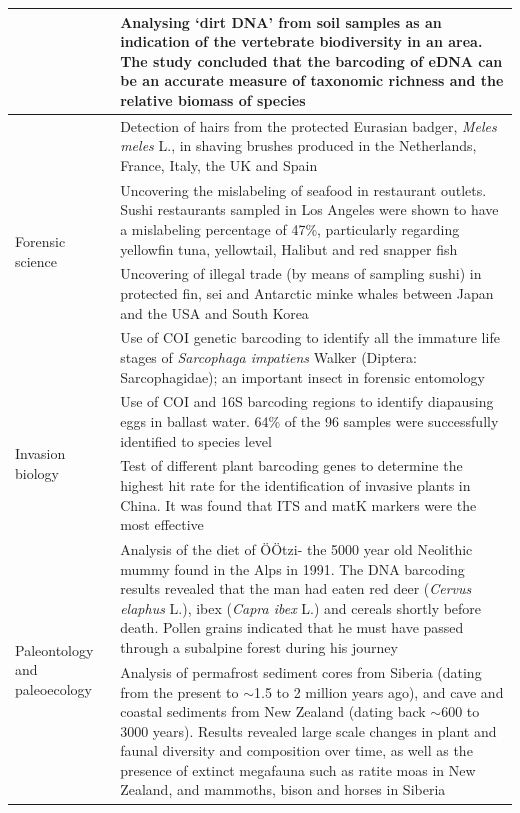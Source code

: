 \begin{landscape}
\begin{longtable}{p{}p{}}
		& Analysing ‘dirt DNA’ from soil samples as an indication of the vertebrate biodiversity in an area. The study concluded that the barcoding of eDNA can be an accurate measure of taxonomic richness and the relative biomass of species \citep{Andersen2012} \\ \midrule
		\multirow{4}{*}{Forensic science} & Detection of hairs from the protected Eurasian badger, \textit{Meles meles} L., in shaving brushes produced in the Netherlands, France, Italy, the UK and Spain \citep{Domingo-Roura2006} \\ \cmidrule(l){2-2} 
		& Uncovering the mislabeling of seafood in restaurant outlets. Sushi restaurants sampled in Los Angeles were shown to have a mislabeling percentage of 47\%, particularly regarding yellowfin tuna, yellowtail, Halibut and red snapper fish \citep{Willette2017} \\ \cmidrule(l){2-2} 
		& Uncovering of illegal trade (by means of sampling sushi) in protected fin, sei and Antarctic minke whales between Japan and the USA and South Korea \citep{Baker2010} \\ \cmidrule(l){2-2} 
		& Use of COI genetic barcoding to identify all the immature life stages of \textit{Sarcophaga impatiens} Walker (Diptera: Sarcophagidae); an important insect in forensic entomology \citep{Meiklejohn2013} \\ \midrule
		\multirow{2}{*}{Invasion biology} & Use of COI and 16S barcoding regions to identify diapausing eggs in ballast water. 64\% of the 96 samples were successfully identified to species level \citep{Briski2011} \\ \cmidrule(l){2-2} 
		& Test of different plant barcoding genes to determine the highest hit rate for the identification of invasive plants in China. It was found that ITS and matK markers were the most effective \citep{Xu2017} \\ \midrule
		\multirow{2}{0cm}{Paleontology and paleoecology} & Analysis of the diet  of \"{O}Ötzi-  the 5000 year old Neolithic mummy found in the Alps in 1991. The DNA barcoding results revealed that the man had eaten red deer (\textit{Cervus elaphus} L.), ibex (\textit{Capra ibex} L.) and cereals shortly before death. Pollen grains indicated that he must have passed through a subalpine forest during his journey \citep{Rollo2002} \\ \cmidrule(l){2-2} 
		& Analysis of permafrost sediment cores from Siberia (dating from the present to $\sim$1.5 to 2 million years ago), and cave and coastal sediments from New Zealand (dating back $\sim$600 to 3000 years). Results revealed large scale changes in plant and faunal diversity and composition over time, as well as the presence of extinct megafauna such as ratite moas in New Zealand, and mammoths, bison and horses in Siberia \citep{Willerslev2003} \\ \bottomrule
		
	\end{longtable}
\end{landscape}

